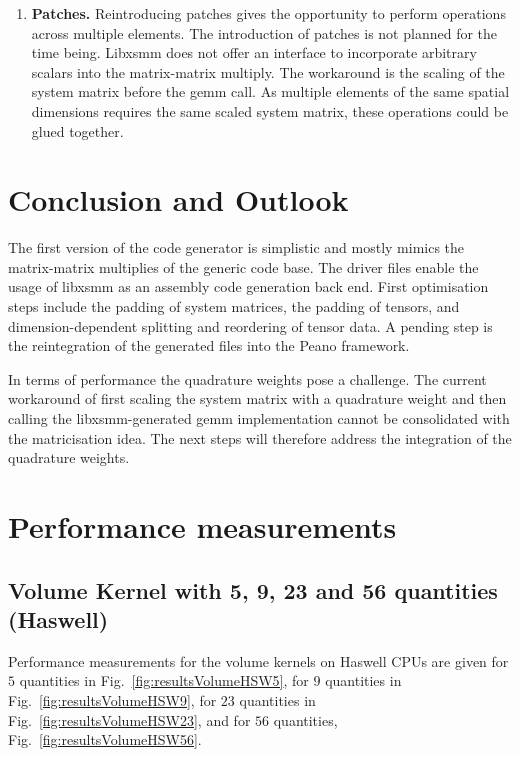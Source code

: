\documentclass{acm_proc_article-sp}
\begin{document}
\begin{enumerate}
\item \textbf{Patches.} Reintroducing patches gives the opportunity to perform operations across multiple elements. The introduction of patches is not planned for the time being. Libxsmm does not offer an interface to incorporate arbitrary scalars into the matrix-matrix multiply. The workaround is the scaling of the system matrix before the gemm call. As multiple elements of the same spatial dimensions requires the same scaled system matrix, these operations could be glued together.
\end{enumerate}


\section{Conclusion and Outlook}
The first version of the code generator is simplistic and mostly mimics the matrix-matrix multiplies of the generic code base. The driver files enable the usage of libxsmm as an assembly code generation back end. First optimisation steps include the padding of system matrices, the padding of tensors, and dimension-dependent splitting and reordering of tensor data. A pending step is the reintegration of the generated files into the Peano framework.

In terms of performance the quadrature weights pose a challenge. The current workaround of first scaling the system matrix with a quadrature weight and then calling the libxsmm-generated gemm implementation cannot be consolidated with the matricisation idea. The next steps will therefore address the integration of the quadrature weights. 





\clearpage
\appendix
\section{Performance measurements} \label{App:Performance measurements}

\subsection{Volume Kernel with 5, 9, 23 and 56 quantities (Haswell)} \label{sec:app1}

Performance measurements for the volume kernels on Haswell CPUs are given for $5$ quantities in Fig.~\ref{fig:resultsVolumeHSW5}, for $9$ quantities in Fig.~\ref{fig:resultsVolumeHSW9}, for $23$ quantities in Fig.~\ref{fig:resultsVolumeHSW23}, and for $56$ quantities, Fig.~\ref{fig:resultsVolumeHSW56}.
\end{document}
